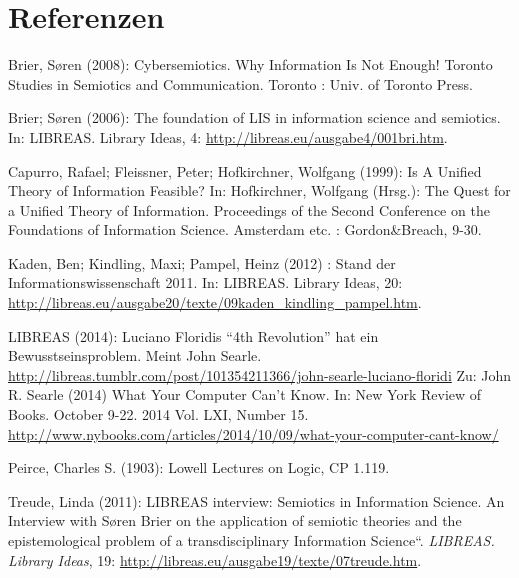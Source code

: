 \documentclass[a4paper,
fontsize=11pt,
oneside,
numbers=noperiodatend,
parskip=half-,
bibliography=totoc,
final
]{scrartcl}
\begin{document}
\section*{Referenzen}\label{referenzen}

Brier, Søren (2008): Cybersemiotics. Why Information Is Not Enough!
Toronto Studies in Semiotics and Communication. Toronto : Univ. of
Toronto Press.

Brier; Søren (2006): The foundation of LIS in information science and
semiotics. In: LIBREAS. Library Ideas, 4:
\url{http://libreas.eu/ausgabe4/001bri.htm}.

Capurro, Rafael; Fleissner, Peter; Hofkirchner, Wolfgang (1999): Is A
Unified Theory of Information Feasible? In: Hofkirchner, Wolfgang
(Hrsg.): The Quest for a Unified Theory of Information. Proceedings of
the Second Conference on the Foundations of Information Science.
Amsterdam etc. : Gordon\&Breach, 9-30.

Kaden, Ben; Kindling, Maxi; Pampel, Heinz (2012) : Stand der
Informationswissenschaft 2011. In: LIBREAS. Library Ideas, 20:
\url{http://libreas.eu/ausgabe20/texte/09kaden_kindling_pampel.htm}.

LIBREAS (2014): Luciano Floridis \enquote{4th Revolution} hat ein
Bewusstseinsproblem. Meint John Searle.
\url{http://libreas.tumblr.com/post/101354211366/john-searle-luciano-floridi}
Zu: John R. Searle (2014) What Your Computer Can't Know. In: New York
Review of Books. October 9-22. 2014 Vol. LXI, Number 15.
\url{http://www.nybooks.com/articles/2014/10/09/what-your-computer-cant-know/}

Peirce, Charles S. (1903): Lowell Lectures on Logic, CP 1.119.

Treude, Linda (2011): LIBREAS interview: Semiotics in Information
Science. An Interview with Søren Brier on the application of semiotic
theories and the epistemological problem of a transdisciplinary
Information Science``. \emph{LIBREAS. Library Ideas}, 19:
\url{http://libreas.eu/ausgabe19/texte/07treude.htm}.

\end{document}
